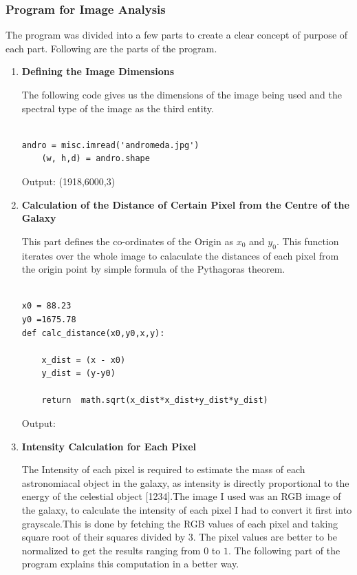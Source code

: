 \documentclass{article}
\begin{document}
\subsubsection{Program for Image Analysis}
The program was divided into a few parts to create a clear concept of purpose of each part. Following are the parts of the program. 
\begin{enumerate}
\item \textbf{Defining the Image Dimensions}

The following code gives us the dimensions of the image being used and the spectral type of the image as the third entity. 

\begin{verbatim}

andro = misc.imread('andromeda.jpg')
    (w, h,d) = andro.shape
\end{verbatim}
 
Output: (1918,6000,3)
   

\item \textbf{Calculation of the Distance of Certain Pixel from the Centre of the Galaxy}

This part defines the co-ordinates of the Origin as $x_{0}$ and $y_{0}$. This function iterates over the whole image to calaculate the distances of each pixel from the origin point by simple formula of the Pythagoras theorem. 

\begin{verbatim}

x0 = 88.23
y0 =1675.78
def calc_distance(x0,y0,x,y):

    x_dist = (x - x0)
    y_dist = (y-y0)

    return  math.sqrt(x_dist*x_dist+y_dist*y_dist)

\end{verbatim}
Output: 

\item \textbf{Intensity Calculation for Each Pixel}

The Intensity of each pixel is required to estimate the mass of each astronomiacal object in the galaxy, as intensity is directly proportional to the energy of the celestial object [1234].The image I used was an RGB image of the galaxy, to calculate the intensity of each pixel I had to convert it first into grayscale.This is done by fetching the RGB values of each pixel and taking square root of their squares divided by $3$. The pixel values are better to be normalized to get the results ranging from $0$ to $1$. The following part of the program explains this computation in a better way.


\end{enumerate}
\end{document}
